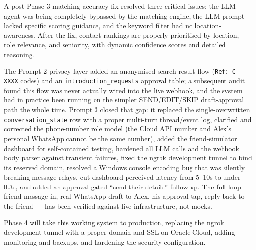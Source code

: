 \documentclass[12pt, a4paper]{report}
\begin{document}
A post-Phase-3 matching accuracy fix resolved three critical issues: the LLM agent was being completely bypassed by the matching engine, the LLM prompt lacked specific scoring guidance, and the keyword filter had no location-awareness. After the fix, contact rankings are properly prioritised by location, role relevance, and seniority, with dynamic confidence scores and detailed reasoning.

The Prompt 2 privacy layer added an anonymised-search-result flow (\texttt{Ref: C-XXXX} codes) and an \texttt{introduction\_requests} approval table; a subsequent audit found this flow was never actually wired into the live webhook, and the system had in practice been running on the simpler SEND/EDIT/SKIP draft-approval path the whole time. Prompt 3 closed that gap: it replaced the single-overwritten \texttt{conversation\_state} row with a proper multi-turn thread/event log, clarified and corrected the phone-number role model (the Cloud API number and Alex's personal WhatsApp cannot be the same number), added the friend-simulator dashboard for self-contained testing, hardened all LLM calls and the webhook body parser against transient failures, fixed the ngrok development tunnel to bind its reserved domain, resolved a Windows console encoding bug that was silently breaking message relays, cut dashboard-perceived latency from 5--10s to under 0.3s, and added an approval-gated ``send their details'' follow-up. The full loop --- friend message in, real WhatsApp draft to Alex, his approval tap, reply back to the friend --- has been verified against live infrastructure, not mocks.

Phase 4 will take this working system to production, replacing the ngrok development tunnel with a proper domain and SSL on Oracle Cloud, adding monitoring and backups, and hardening the security configuration.
\end{document}
